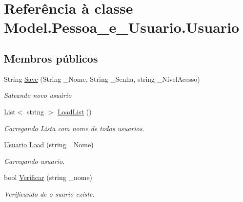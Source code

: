 \hypertarget{class_model_1_1_pessoa__e___usuario_1_1_usuario}{}\section{Referência à classe Model.\+Pessoa\+\_\+e\+\_\+\+Usuario.\+Usuario}
\label{class_model_1_1_pessoa__e___usuario_1_1_usuario}
\subsection*{Membros públicos}
\begin{DoxyCompactItemize}
\item 
String \hyperlink{class_model_1_1_pessoa__e___usuario_1_1_usuario_a7904f8842d9978778f7ab375dac1598a}{Save} (String \+\_\+\+Nome, String \+\_\+\+Senha, string \+\_\+\+Nivel\+Acesso)
\begin{DoxyCompactList}\small\item\em Salvando novo usuário \end{DoxyCompactList}\item 
List$<$ string $>$ \hyperlink{class_model_1_1_pessoa__e___usuario_1_1_usuario_aaafe59d54bd44b2cd36f9b7032df5ba3}{Load\+List} ()
\begin{DoxyCompactList}\small\item\em Carregando Lista com nome de todos usuarios. \end{DoxyCompactList}\item 
\hyperlink{class_model_1_1_pessoa__e___usuario_1_1_usuario}{Usuario} \hyperlink{class_model_1_1_pessoa__e___usuario_1_1_usuario_ab5b4ff8011ebf25cddea82c55ca7cb4e}{Load} (string \+\_\+\+Nome)
\begin{DoxyCompactList}\small\item\em Carregando usuario. \end{DoxyCompactList}\item 
bool \hyperlink{class_model_1_1_pessoa__e___usuario_1_1_usuario_aafad0b4e2f96cc058b92033da5dcb193}{Verificar} (string \+\_\+nome)
\begin{DoxyCompactList}\small\item\em Verificando de o suario existe. \end{DoxyCompactList}\end{DoxyCompactItemize}
